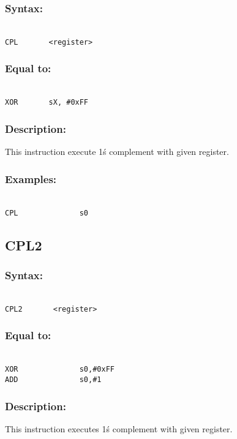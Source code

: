         \subsubsection{Syntax:}
        {
            ~\\
            \usecodefont
            \verb'CPL       <register>'
        }
        \subsubsection{Equal to:}
        {
            ~\\
            \usecodefont
            \verb'XOR       sX, #0xFF'
        }
        \subsubsection{Description:}
            This instruction execute 1\'s complement with given register.

        \subsubsection{Examples:}
        {
            ~\\
            \usecodefont
            \verb'CPL              s0'\\
        }

    \subsection{CPL2}
        \subsubsection{Syntax:}
        {
            ~\\
            \usecodefont
            \verb'CPL2       <register>'
        }
        \subsubsection{Equal to:}
        {
            ~\\
            \usecodefont
            \verb'XOR              s0,#0xFF'\\
            \verb'ADD              s0,#1'\\
        }
        \subsubsection{Description:}
            This instruction executes 1\'s complement with given register.

